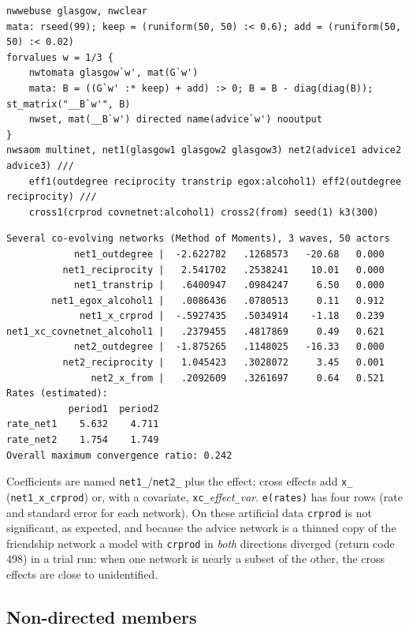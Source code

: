 \begin{lstlisting}
nwwebuse glasgow, nwclear
mata: rseed(99); keep = (runiform(50, 50) :< 0.6); add = (runiform(50, 50) :< 0.02)
forvalues w = 1/3 {
    nwtomata glasgow`w', mat(G`w')
    mata: B = ((G`w' :* keep) + add) :> 0; B = B - diag(diag(B)); st_matrix("__B`w'", B)
    nwset, mat(__B`w') directed name(advice`w') nooutput
}
nwsaom multinet, net1(glasgow1 glasgow2 glasgow3) net2(advice1 advice2 advice3) ///
    eff1(outdegree reciprocity transtrip egox:alcohol1) eff2(outdegree reciprocity) ///
    cross1(crprod covnetnet:alcohol1) cross2(from) seed(1) k3(300)
\end{lstlisting}
\begin{lstlisting}
Several co-evolving networks (Method of Moments), 3 waves, 50 actors
            net1_outdegree |  -2.622782   .1268573   -20.68   0.000
          net1_reciprocity |   2.541702   .2538241    10.01   0.000
            net1_transtrip |   .6400947   .0984247     6.50   0.000
        net1_egox_alcohol1 |   .0086436   .0780513     0.11   0.912
             net1_x_crprod |  -.5927435   .5034914    -1.18   0.239
net1_xc_covnetnet_alcohol1 |   .2379455   .4817869     0.49   0.621
            net2_outdegree |  -1.875265   .1148025   -16.33   0.000
          net2_reciprocity |   1.045423   .3028072     3.45   0.001
               net2_x_from |   .2092609   .3261697     0.64   0.521
Rates (estimated):
           period1  period2
rate_net1    5.632    4.711
rate_net2    1.754    1.749
Overall maximum convergence ratio: 0.242
\end{lstlisting}
Coefficients are named \texttt{net1\_}/\texttt{net2\_} plus the effect; cross effects add \texttt{x\_} (\texttt{net1\_x\_crprod}) or, with a covariate, \texttt{xc\_}\emph{effect}\texttt{\_}\emph{var}. \texttt{e(rates)} has four rows (rate and standard error for each network). On these artificial data \texttt{crprod} is not significant, as expected, and because the advice network is a thinned copy of the friendship network a model with \texttt{crprod} in \emph{both} directions diverged (return code 498) in a trial run: when one network is nearly a subset of the other, the cross effects are close to unidentified.

\subsection{Non-directed members}

